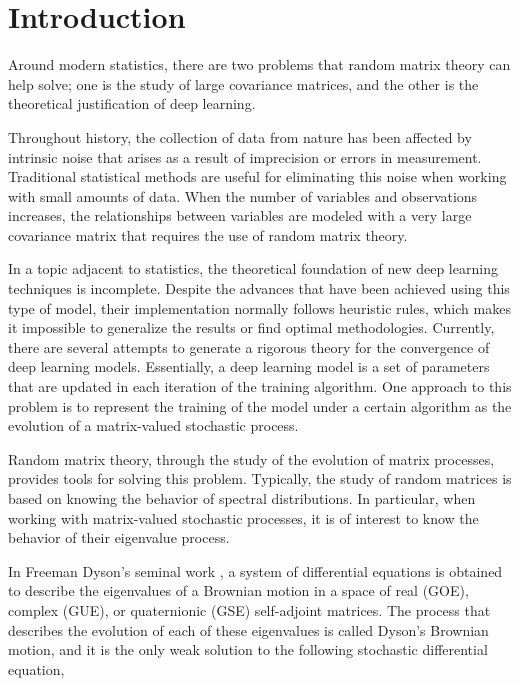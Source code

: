 \chapter*{Introduction}

Around modern statistics, there are two problems that random matrix theory can help solve; one is the study of large covariance matrices, and the other is the theoretical justification of deep learning.

Throughout history, the collection of data from nature has been affected by intrinsic noise that arises as a result of imprecision or errors in measurement. Traditional statistical methods are useful for eliminating this noise when working with small amounts of data. When the number of variables and observations increases, the relationships between variables are modeled with a very large covariance matrix that requires the use of random matrix theory.

In a topic adjacent to statistics, the theoretical foundation of new deep learning techniques is incomplete. Despite the advances that have been achieved using this type of model, their implementation normally follows heuristic rules, which makes it impossible to generalize the results or find optimal methodologies. Currently, there are several attempts to generate a rigorous theory for the convergence of deep learning models. Essentially, a deep learning model is a set of parameters that are updated in each iteration of the training algorithm. One approach to this problem is to represent the training of the model under a certain algorithm as the evolution of a matrix-valued stochastic process.

Random matrix theory, through the study of the evolution of matrix processes, provides tools for solving this problem. Typically, the study of random matrices is based on knowing the behavior of spectral distributions. In particular, when working with matrix-valued stochastic processes, it is of interest to know the behavior of their eigenvalue process.

In Freeman Dyson's seminal work \cite{article:dyson}, a system of differential equations is obtained to describe the eigenvalues of a Brownian motion in a space of real (GOE), complex (GUE), or quaternionic (GSE) self-adjoint matrices. The process that describes the evolution of each of these eigenvalues is called Dyson's Brownian motion, and it is the only weak solution to the following stochastic differential equation,

